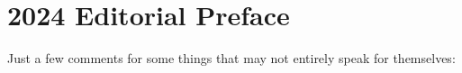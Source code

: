 \chapter{2024 Editorial Preface}

Just a few comments for some things that may not entirely speak for themselves:

